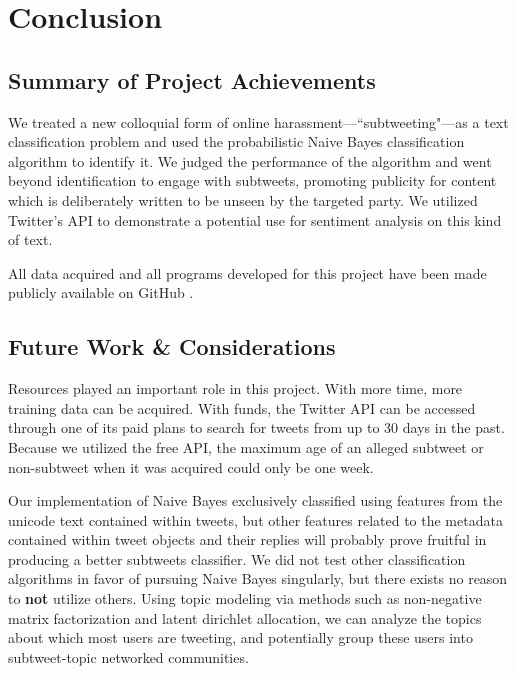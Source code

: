 \documentclass[11pt, twoside, reqno]{book}
\begin{document}
\chapter{Conclusion}
\label{conclusion}

\section{Summary of Project Achievements}
\label{summary}

We treated a new colloquial form of online harassment---``subtweeting"---as a text classification problem and used the probabilistic Naive Bayes classification algorithm to identify it. We judged the performance of the algorithm and went beyond identification to engage with subtweets, promoting publicity for content which is deliberately written to be unseen by the targeted party. We utilized Twitter's API to demonstrate a potential use for sentiment analysis on this kind of text.

\noindent
All data acquired and all programs developed for this project have been made publicly available on GitHub \cite{github}.

\section{Future Work \& Considerations}
\label{future_work_and_considerations}

Resources played an important role in this project. With more time, more training data can be acquired. With funds, the Twitter API can be accessed through one of its paid plans to search for tweets from up to 30 days in the past. Because we utilized the free API, the maximum age of an alleged subtweet or non-subtweet when it was acquired could only be one week. 

Our implementation of Naive Bayes exclusively classified using features from the unicode text contained within tweets, but other features related to the metadata contained within tweet objects and their replies will probably prove fruitful in producing a better subtweets classifier. We did not test other classification algorithms in favor of pursuing Naive Bayes singularly, but there exists no reason to \textbf{not} utilize others. Using topic modeling via methods such as non-negative matrix factorization and latent dirichlet allocation, we can analyze the topics about which most users are tweeting, and potentially group these users into subtweet-topic networked communities.
\end{document}
